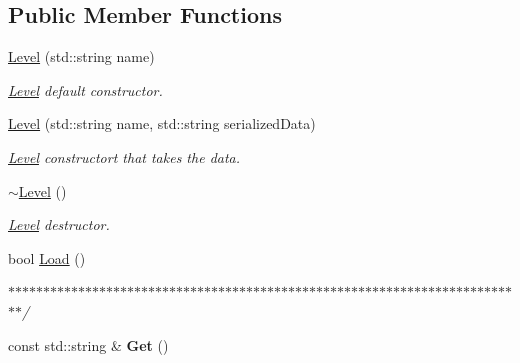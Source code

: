 \subsection*{Public Member Functions}
\begin{DoxyCompactItemize}
\item 
\hypertarget{classDCEngine_1_1Level_a48f3d210c0b7dbea32c321cf72a3ce7b}{\hyperlink{classDCEngine_1_1Level_a48f3d210c0b7dbea32c321cf72a3ce7b}{Level} (std\-::string name)}\label{classDCEngine_1_1Level_a48f3d210c0b7dbea32c321cf72a3ce7b}

\begin{DoxyCompactList}\small\item\em \hyperlink{classDCEngine_1_1Level}{Level} default constructor. \end{DoxyCompactList}\item 
\hypertarget{classDCEngine_1_1Level_a80ddf961b3e16c366af06254c8ac8a19}{\hyperlink{classDCEngine_1_1Level_a80ddf961b3e16c366af06254c8ac8a19}{Level} (std\-::string name, std\-::string serialized\-Data)}\label{classDCEngine_1_1Level_a80ddf961b3e16c366af06254c8ac8a19}

\begin{DoxyCompactList}\small\item\em \hyperlink{classDCEngine_1_1Level}{Level} constructort that takes the data. \end{DoxyCompactList}\item 
\hypertarget{classDCEngine_1_1Level_aed8f83765d1538727b368eafdf7ff20d}{\hyperlink{classDCEngine_1_1Level_aed8f83765d1538727b368eafdf7ff20d}{$\sim$\-Level} ()}\label{classDCEngine_1_1Level_aed8f83765d1538727b368eafdf7ff20d}

\begin{DoxyCompactList}\small\item\em \hyperlink{classDCEngine_1_1Level}{Level} destructor. \end{DoxyCompactList}\item 
bool \hyperlink{classDCEngine_1_1Level_a7c6442a36ea6cc6825c5ce238e0ab3aa}{Load} ()
\begin{DoxyCompactList}\small\item\em $\ast$$\ast$$\ast$$\ast$$\ast$$\ast$$\ast$$\ast$$\ast$$\ast$$\ast$$\ast$$\ast$$\ast$$\ast$$\ast$$\ast$$\ast$$\ast$$\ast$$\ast$$\ast$$\ast$$\ast$$\ast$$\ast$$\ast$$\ast$$\ast$$\ast$$\ast$$\ast$$\ast$$\ast$$\ast$$\ast$$\ast$$\ast$$\ast$$\ast$$\ast$$\ast$$\ast$$\ast$$\ast$$\ast$$\ast$$\ast$$\ast$$\ast$$\ast$$\ast$$\ast$$\ast$$\ast$$\ast$$\ast$$\ast$$\ast$$\ast$$\ast$$\ast$$\ast$$\ast$$\ast$$\ast$$\ast$$\ast$$\ast$$\ast$$\ast$$\ast$$\ast$$\ast$/ \end{DoxyCompactList}\item 
\hypertarget{classDCEngine_1_1Level_a753f99b6cf12c193fb268e07e4057e23}{const std\-::string \& {\bfseries Get} ()}\label{classDCEngine_1_1Level_a753f99b6cf12c193fb268e07e4057e23}


\end{DoxyCompactItemize}
